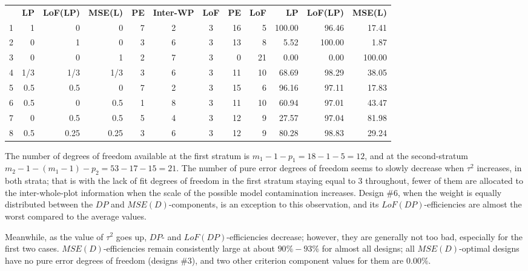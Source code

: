 \begin{table}[h]
{\begin{tabular}{rrrrcccrrrrr}
  & \textbf{LP} & \textbf{LoF(LP)} & \textbf{MSE(L)} & \textbf{PE} & \textbf{Inter-WP} & \textbf{LoF} & \textbf{PE}      & \textbf{LoF}      & \textbf{LP} & \textbf{LoF(LP)} & \textbf{MSE(L)} \\
1 & 1    & 0    & 0    & \multicolumn{1}{|r}{7} & 2 & 3 & \multicolumn{1}{|r}{16} & 5  & \multicolumn{1}{|r}{100.00} & 96.46  & 17.41  \\
2 & 0    & 1    & 0    & \multicolumn{1}{|r}{3} & 6 & 3 & \multicolumn{1}{|r}{13} & 8  & \multicolumn{1}{|r}{5.52}   & 100.00 & 1.87   \\
3 & 0    & 0    & 1    & \multicolumn{1}{|r}{2} & 7 & 3 & \multicolumn{1}{|r}{0}  & 21 & \multicolumn{1}{|r}{0.00}   & 0.00   & 100.00 \\
4 & 1/3 & 1/3 & 1/3    & \multicolumn{1}{|r}{3} & 6 & 3 & \multicolumn{1}{|r}{11} & 10 & \multicolumn{1}{|r}{68.69}  & 98.29  & 38.05  \\
5 & 0.5  & 0.5  & 0    & \multicolumn{1}{|r}{7} & 2 & 3 & \multicolumn{1}{|r}{15} & 6  & \multicolumn{1}{|r}{96.16}  & 97.11  & 17.83  \\
6 & 0.5  & 0    & 0.5  & \multicolumn{1}{|r}{1} & 8 & 3 & \multicolumn{1}{|r}{11} & 10 & \multicolumn{1}{|r}{60.94}  & 97.01  & 43.47  \\
7 & 0    & 0.5  & 0.5  & \multicolumn{1}{|r}{5} & 4 & 3 & \multicolumn{1}{|r}{12} & 9  & \multicolumn{1}{|r}{27.57}  & 97.04  & 81.98  \\
8 & 0.5  & 0.25 & 0.25 & \multicolumn{1}{|r}{3} & 6 & 3 & \multicolumn{1}{|r}{12} & 9  & \multicolumn{1}{|r}{80.28}  & 98.83  & 29.24  \\
\end{tabular}
}
\end{table}  

The number of degrees of freedom available at the first stratum is $m_1-1-p_1=18-1-5=12$, and at the second-stratum $m_2-1-(m_1-1)-p_2=53-17-15=21$. The number of pure error degrees of freedom seems to slowly decrease when $\tau^2$ increases, in both strata; that is with the lack of fit degrees of freedom in the first stratum staying equal to $3$ throughout, fewer of them are allocated to the inter-whole-plot information when the scale of the possible model contamination increases. Design \#$6$, when the weight is equally distributed between the $DP$ and $MSE(D)$-components, is an exception to this observation, and its $LoF(DP)$-efficiencies are almost the worst compared to the average values. 

Meanwhile, as the value of $\tau^2$ goes up, $DP$- and $LoF(DP)$-efficiencies decrease; however, they are generally not too bad, especially for the first two cases. $MSE(D)$-efficiencies remain consistently large at about $90\%-93\%$ for almost all designs; all $MSE(D)$-optimal designs have no pure error degrees of freedom (designs \#$3$), and two other criterion component values for them are $0.00\%$. 

